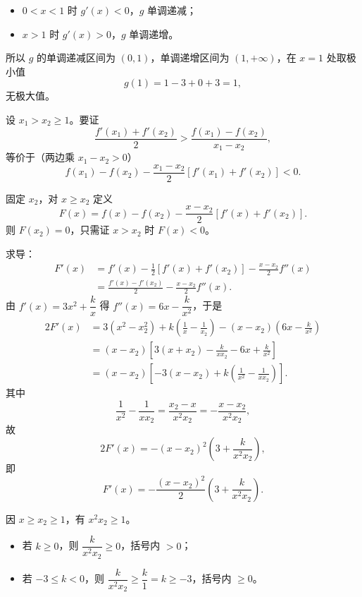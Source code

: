 \begin{answer}
\begin{itemize}
\item $0<x<1$ 时 $g'(x)<0$，$g$ 单调递减；
\item $x>1$ 时 $g'(x)>0$，$g$ 单调递增。
\end{itemize}

所以 $g$ 的单调递减区间为 $(0,1)$，单调递增区间为 $(1,+\infty)$，在 $x=1$ 处取极小值
\nopagebreak[4]
\[g(1)=1-3+0+3=1,\]
无极大值。


设 $x_1>x_2\geqslant1$。要证
\nopagebreak[4]
\[\frac{f'(x_1)+f'(x_2)}2>\frac{f(x_1)-f(x_2)}{x_1-x_2},\]
等价于（两边乘 $x_1-x_2>0$）
\nopagebreak[4]
\[f(x_1)-f(x_2)-\frac{x_1-x_2}2\left[f'(x_1)+f'(x_2)\right]<0 .\]

固定 $x_2$，对 $x\geqslant x_2$ 定义
\nopagebreak[4]
\[F(x)=f(x)-f(x_2)-\frac{x-x_2}2\left[f'(x)+f'(x_2)\right].\]
则 $F(x_2)=0$，只需证 $x>x_2$ 时 $F(x)<0$。

求导：
\nopagebreak[4]
\[\begin{aligned}
F'(x)&=f'(x)-\frac12\left[f'(x)+f'(x_2)\right]-\frac{x-x_2}2f''(x)\\
&=\frac{f'(x)-f'(x_2)}2-\frac{x-x_2}2f''(x).
\end{aligned}\]
由 $f'(x)=3x^2+\dfrac kx$ 得 $f''(x)=6x-\dfrac k{x^2}$，于是
\nopagebreak[4]
\[\begin{aligned}
2F'(x)&=3\left(x^2-x_2^2\right)+k\left(\frac1x-\frac1{x_2}\right)-(x-x_2)\left(6x-\frac k{x^2}\right)\\
&=(x-x_2)\left[3(x+x_2)-\frac{k}{xx_2}-6x+\frac k{x^2}\right]\\
&=(x-x_2)\left[-3(x-x_2)+k\left(\frac1{x^2}-\frac1{xx_2}\right)\right].
\end{aligned}\]
其中
\nopagebreak[4]
\[\frac1{x^2}-\frac1{xx_2}=\frac{x_2-x}{x^2x_2}=-\frac{x-x_2}{x^2x_2},\]
故
\nopagebreak[4]
\[2F'(x)=-(x-x_2)^2\left(3+\frac{k}{x^2x_2}\right),\]
即
\nopagebreak[4]
\[F'(x)=-\frac{(x-x_2)^2}2\left(3+\frac{k}{x^2x_2}\right).\]

因 $x\geqslant x_2\geqslant1$，有 $x^2x_2\geqslant1$。

\begin{itemize}
\item 若 $k\geqslant0$，则 $\dfrac{k}{x^2x_2}\geqslant0$，括号内 $>0$；
\item 若 $-3\leqslant k<0$，则 $\dfrac{k}{x^2x_2}\geqslant\dfrac{k}{1}=k\geqslant-3$，括号内 $\geqslant0$。
\end{itemize}


\end{answer}
